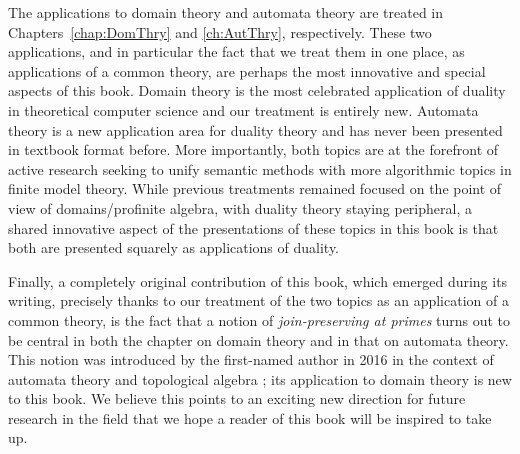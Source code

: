 The applications to domain theory and automata theory are treated  in Chapters~\ref{chap:DomThry} and \ref{ch:AutThry}, respectively. These two applications, and in particular the fact that we treat them in one place, as applications of a common theory, are perhaps the most innovative and special aspects of this book. Domain theory is the most celebrated application of duality in theoretical computer science and our treatment is entirely new. Automata theory is a new application area for duality theory and has never been presented in textbook format before. More importantly, both topics are at the forefront of active research seeking to unify semantic methods with more algorithmic topics in finite model theory. While previous treatments remained focused on the point of view of domains/profinite algebra, with duality theory staying peripheral, a shared innovative aspect of the presentations of these topics in this book is that both are presented squarely as applications of duality.

Finally, a completely original contribution of this book, which emerged during its writing, precisely thanks to our treatment of the two topics as an application of a common theory, is the fact that a notion of \emph{join-preserving at primes} turns out to be central in both the chapter on domain theory and in that on automata theory. This notion was introduced by the first-named author in 2016 in the context of automata theory and topological algebra \cite{Geh16}; its application to domain theory is new to this book. We believe this points to an exciting new direction for future research in the field that we hope a reader of this book will be inspired to take up.